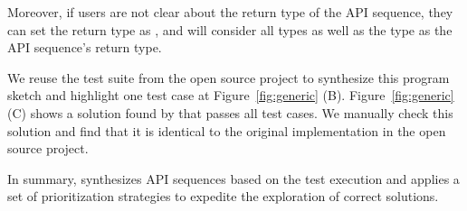    Moreover, if users are not clear about the return type of the API sequence, they can set the return type as , and \tool will consider all types  as well as the  type as the API sequence's return type. 
   
    We reuse the test suite from the  open source project to synthesize this program sketch and highlight one test case at   Figure~\ref{fig:generic} (B).  Figure~\ref{fig:generic} (C) shows a solution found by \tool that passes all test cases. We manually check this solution and find that it is identical to the original implementation in the open source project.

In summary, \tool synthesizes API sequences based on the test execution and applies a set of prioritization strategies to expedite the exploration of correct solutions. 








